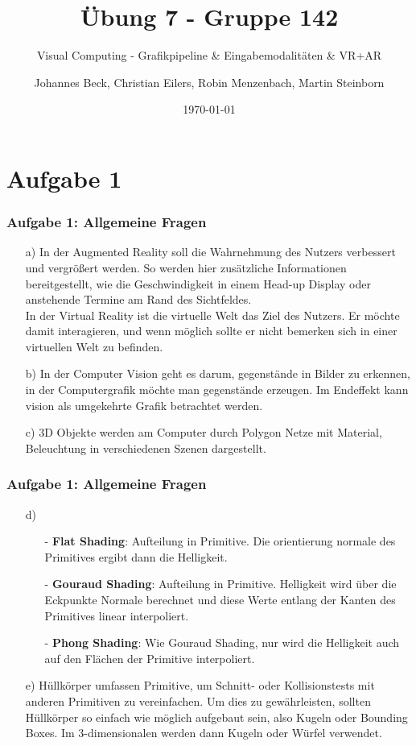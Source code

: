 \documentclass[accentcolor=tud9c,colorbacktitle,inverttitle,landscape,german,presentation,t]{tudbeamer}
\begin{document}
\title{\"Ubung 7 - Gruppe 142}
\subtitle{Visual Computing - Grafikpipeline \& Eingabemodalit\"aten \& VR+AR} 

\author[Johannes Beck, Christian Eilers, Robin Menzenbach, Martin Steinborn]{Johannes Beck, Christian Eilers, Robin Menzenbach, Martin Steinborn}


\date{\today}

\begin{titleframe}
\end{titleframe}

\section{Aufgabe 1}
	\begin{frame}
		\frametitle{Aufgabe 1: Allgemeine Fragen}
		\begin{itemize}
		\item[a)]In der Augmented Reality soll die Wahrnehmung des Nutzers verbessert und vergrößert werden. So werden hier zusätzliche Informationen bereitgestellt, wie die Geschwindigkeit in einem Head-up Display oder anstehende Termine am Rand des Sichtfeldes.\\
In der Virtual Reality ist die virtuelle Welt das Ziel des Nutzers. Er möchte damit interagieren, und wenn möglich sollte er nicht bemerken sich in einer virtuellen Welt zu befinden.
		\item[b)]In der Computer Vision geht es darum, gegenstände in Bilder zu erkennen, in der Computergrafik möchte man gegenstände erzeugen. Im Endeffekt kann vision als umgekehrte Grafik betrachtet werden.
		\item[c)] 3D Objekte werden am Computer durch Polygon Netze mit Material, Beleuchtung in verschiedenen Szenen dargestellt.
		\end{itemize}
	\end{frame}


	\begin{frame}
		\frametitle{Aufgabe 1: Allgemeine Fragen}
		\begin{itemize}
		\item[d)]
		\begin{itemize}
			 \item[-] \textbf{Flat Shading}: Aufteilung in Primitive. Die orientierung normale des Primitives ergibt dann die Helligkeit.
			 \item[-] \textbf{Gouraud Shading}: Aufteilung in Primitive. Helligkeit wird über die Eckpunkte Normale berechnet und diese Werte entlang der Kanten des Primitives linear interpoliert.
			 \item[-] \textbf{Phong Shading}: Wie Gouraud Shading, nur wird die Helligkeit auch auf den Flächen der Primitive interpoliert.
		\end{itemize}
		\item[e)]  Hüllkörper umfassen Primitive, um Schnitt- oder Kollisionstests mit anderen Primitiven zu vereinfachen. Um dies zu gewährleisten, sollten Hüllkörper so einfach wie möglich aufgebaut sein, also Kugeln oder Bounding Boxes. Im 3-dimensionalen werden dann Kugeln oder Würfel verwendet.
		\end{itemize}
	\end{frame}
\end{document}
